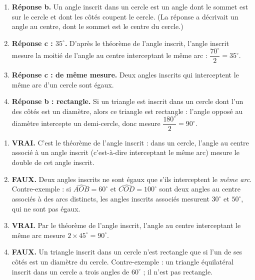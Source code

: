 \documentclass[11pt]{article}
\newcommand{\cle}[1]{{\popxbold\color{popdark}#1}}
\begin{document}
\begin{corrige}
\begin{enumerate}
\item \textbf{Réponse b.} Un angle inscrit dans un cercle est un angle dont le sommet est \cle{sur le cercle} et dont les côtés coupent le cercle. (La réponse a décrivait un angle au centre, dont le sommet est le centre du cercle.)
\item \textbf{Réponse c : $35^{\circ}$.} D'après le théorème de l'angle inscrit, l'angle inscrit mesure la moitié de l'angle au centre interceptant le même arc : $\dfrac{70^{\circ}}{2} = 35^{\circ}$.
\item \textbf{Réponse c : de même mesure.} Deux angles inscrits qui interceptent le même arc d'un cercle sont égaux.
\item \textbf{Réponse b : rectangle.} Si un triangle est inscrit dans un cercle dont l'un des côtés est un diamètre, alors ce triangle est rectangle : l'angle opposé au diamètre intercepte un demi-cercle, donc mesure $\dfrac{180^{\circ}}{2} = 90^{\circ}$.
\end{enumerate}
\end{corrige}

\begin{corrige}
\begin{enumerate}
\item \textbf{VRAI.} C'est le théorème de l'angle inscrit : dans un cercle, l'angle au centre associé à un angle inscrit (c'est-à-dire interceptant le même arc) mesure le double de cet angle inscrit.
\item \textbf{FAUX.} Deux angles inscrits ne sont égaux que s'ils interceptent le \emph{même arc}. Contre-exemple : si $\widehat{AOB} = 60^{\circ}$ et $\widehat{COD} = 100^{\circ}$ sont deux angles au centre associés à des arcs distincts, les angles inscrits associés mesurent $30^{\circ}$ et $50^{\circ}$, qui ne sont pas égaux.
\item \textbf{VRAI.} Par le théorème de l'angle inscrit, l'angle au centre interceptant le même arc mesure $2 \times 45^{\circ} = 90^{\circ}$.
\item \textbf{FAUX.} Un triangle inscrit dans un cercle n'est rectangle que si l'un de ses côtés est un diamètre du cercle. Contre-exemple : un triangle équilatéral inscrit dans un cercle a trois angles de $60^{\circ}$ ; il n'est pas rectangle.
\end{enumerate}
\end{corrige}
\end{document}
